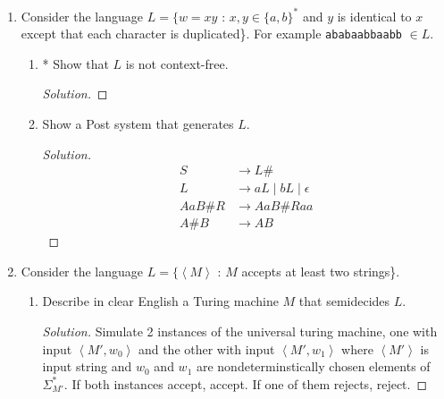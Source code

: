 \documentclass[10pt]{article}
\newcommand{\brackets}[1]{\left< #1 \right>}
\begin{document}
\begin{enumerate}[1)]
\begin{enumerate}
\begin{proof}[Solution]
\begin{enumerate}[1.]
\item
Create $\alpha '$ and $\beta '$, minimized versions of $\alpha$ and $\beta$ respectively.

\item
If $\alpha '$ equals $\beta '$, accept.  Otherwise reject.
\end{enumerate}
\end{proof}
\end{enumerate}



\item
Consider the language  $L = \{w = xy$ :  $x, y \in \{a, b\}^*$ and $y$ is identical to $x$ except that each character is 
duplicated\}.  For example \texttt{ababaabbaabb} $\in L$.
\begin{enumerate}
\item
* Show that $L$ is not context-free.
\begin{proof}[Solution]
\end{proof}

\item
Show a Post system that generates $L$.
\begin{proof}[Solution]
\begin{align*}
S &\rightarrow L\#\\
L &\rightarrow aL \mid bL \mid \epsilon\\
AaB\#R &\rightarrow AaB\#Raa\\
A\#B &\rightarrow AB
\end{align*}
\end{proof}
\end{enumerate}

\pagebreak

\item
Consider the language $L = \{\brackets{M}$ : $M$ accepts at least two strings\}.
\begin{enumerate}
\item
Describe in clear English a Turing machine $M$ that semidecides $L$.
\begin{proof}[Solution]
Simulate 2 instances of the universal turing machine, one with input $\brackets{M', w_0}$ and the other with input $\brackets{M', w_1}$ where $\brackets{M'}$ is input string and $w_0$ and $w_1$ are nondeterminstically chosen elements of $\Sigma _{M'}^*$.  If both instances accept, accept.  If one of them rejects, reject.
\end{proof}


\end{enumerate}
\end{enumerate}
\end{document}
